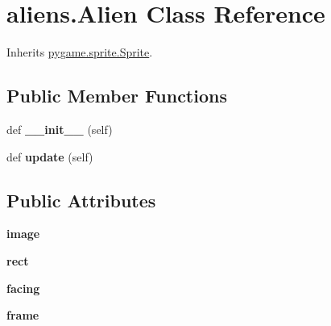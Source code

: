 \hypertarget{classaliens_1_1_alien}{}\section{aliens.\+Alien Class Reference}
\label{classaliens_1_1_alien}


Inherits \hyperlink{classpygame_1_1sprite_1_1_sprite}{pygame.\+sprite.\+Sprite}.

\subsection*{Public Member Functions}
\begin{DoxyCompactItemize}
\item 
\mbox{\label{classaliens_1_1_alien_a870eeb8f52e72257cfc72cad251b409c}} 
def {\bfseries \+\_\+\+\_\+init\+\_\+\+\_\+} (self)
\item 
\mbox{\label{classaliens_1_1_alien_a13021268851f7c196c6874330b7c3967}} 
def {\bfseries update} (self)
\end{DoxyCompactItemize}
\subsection*{Public Attributes}
\begin{DoxyCompactItemize}
\item 
\mbox{\label{classaliens_1_1_alien_a511de4be90d0d3466d358a00a628d6ad}} 
{\bfseries image}
\item 
\mbox{\label{classaliens_1_1_alien_a268b9f1ad3213af633c8db39a3db996c}} 
{\bfseries rect}
\item 
\mbox{\label{classaliens_1_1_alien_ab3a5a253e70006da8398cedeb4959e0c}} 
{\bfseries facing}
\item 
\mbox{\label{classaliens_1_1_alien_adc1e4a6a045c5bc3d8f2660ce841a770}} 
{\bfseries frame}
\end{DoxyCompactItemize}

